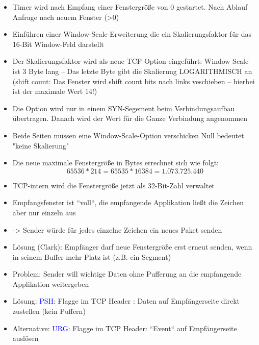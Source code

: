 \begin{itemize}
    \item Timer wird nach Empfang einer Fenstergröße von 0 gestartet. Nach Ablauf Anfrage nach neuem Fenster (>0)
\end{itemize}

\begin{itemize}
    \item Einführen einer Window-Scale-Erweiterung die ein Skalierungsfaktor für das 16-Bit Window-Feld darstellt
    \item Der Skalierungsfaktor wird als neue TCP-Option eingeführt: Window Scale ist 3 Byte lang – Das letzte Byte gibt die Skalierung LOGARITHMISCH an (shift count: Das Fenster wird shift count bits nach links veschieben – hierbei ist der maximale Wert 14!)
    \item Die Option wird nur in einem SYN-Segement beim Verbindungsaufbau übertragen.
    Danach wird der Wert für die Ganze Verbindung angenommen
    \item Beide Seiten müssen eine Window-Scale-Option verschicken Null bedeutet "keine Skalierung"
    \item Die neue maximale Fenstergröße in Bytes errechnet sich wie folgt: \[65536 * 214 = 65535 * 16384 = 1.073.725.440\]
    \item TCP-intern wird die Fenstergröße jetzt als 32-Bit-Zahl verwaltet
\end{itemize}

\begin{itemize}
    \item Empfangsfenster ist ``voll``, die empfangende Applikation ließt die Zeichen aber nur einzeln aus
    \item -> Sender würde für jedes einzelne Zeichen ein neues Paket senden
    \item Lösung (Clark): Empfänger darf neue Fenstergröße erst erneut senden, wenn in seinem Buffer mehr Platz ist (z.B. ein Segment)
\end{itemize}

\begin{itemize}
    \item Problem: Sender will wichtige Daten ohne Pufferung an die empfangende Applikation weitergeben
    \item Lösung: \textcolor{blue}{PSH}: Flagge im TCP Header : Daten auf Empfängerseite direkt zustellen (kein Puffern)
    \item Alternative: \textcolor{blue}{URG}: Flagge im TCP Header: ``Event`` auf Empfängerseite auslösen
\end{itemize}